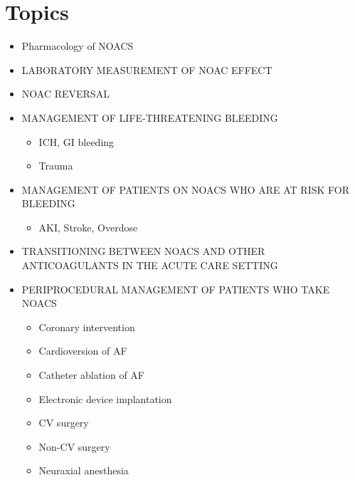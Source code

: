 \documentclass{article}
\begin{document}
\section{Topics}
\begin{itemize}
	\item Pharmacology of NOACS
	\item LABORATORY MEASUREMENT OF NOAC EFFECT
	\item NOAC REVERSAL
	\item MANAGEMENT OF LIFE-THREATENING BLEEDING
	\begin{itemize}
		\item ICH, GI bleeding
		\item Trauma
	\end{itemize}
	\item MANAGEMENT OF PATIENTS ON NOACS WHO ARE AT RISK FOR BLEEDING
	\begin{itemize}
		\item AKI, Stroke, Overdose
	\end{itemize}
	\item TRANSITIONING BETWEEN NOACS AND OTHER ANTICOAGULANTS IN THE ACUTE CARE SETTING
	\item PERIPROCEDURAL MANAGEMENT OF PATIENTS WHO TAKE NOACS
	\begin{itemize}
		\item Coronary intervention
		\item Cardioversion of AF
		\item Catheter ablation of AF
		\item Electronic device implantation
		\item CV surgery
		\item Non-CV surgery
		\item Neuraxial anesthesia
	\end{itemize}
\end{itemize}


	
\end{document}
